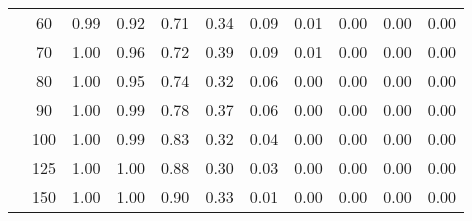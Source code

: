 \begin{table}[t]
\begin{center}
\begin{subtable}[c]{\textwidth}
\begin{center}
\begin{tabular}{rcccccccccc}
                                        & \multicolumn{1}{c|}{60}  & \num{0.99}  & \num{0.92}  & \num{0.71}  & \num{0.34}  & \num{0.09}  & \num{0.01}  & \num{0.00}  & \num{0.00}  & \num{0.00}  \\
                                        & \multicolumn{1}{c|}{70}  & \num{1.00}  & \num{0.96}  & \num{0.72}  & \num{0.39}  & \num{0.09}  & \num{0.01}  & \num{0.00}  & \num{0.00}  & \num{0.00}  \\
                                        & \multicolumn{1}{c|}{80}  & \num{1.00}  & \num{0.95}  & \num{0.74}  & \num{0.32}  & \num{0.06}  & \num{0.00}  & \num{0.00}  & \num{0.00}  & \num{0.00}  \\
                                        & \multicolumn{1}{c|}{90}  & \num{1.00}  & \num{0.99}  & \num{0.78}  & \num{0.37}  & \num{0.06}  & \num{0.00}  & \num{0.00}  & \num{0.00}  & \num{0.00}  \\
                                        & \multicolumn{1}{c|}{100}  & \num{1.00}  & \num{0.99}  & \num{0.83}  & \num{0.32}  & \num{0.04}  & \num{0.00}  & \num{0.00}  & \num{0.00}  & \num{0.00}  \\
                                        & \multicolumn{1}{c|}{125}  & \num{1.00}  & \num{1.00}  & \num{0.88}  & \num{0.30}  & \num{0.03}  & \num{0.00}  & \num{0.00}  & \num{0.00}  & \num{0.00}  \\
                                        & \multicolumn{1}{c|}{150}  & \num{1.00}  & \num{1.00}  & \num{0.90}  & \num{0.33}  & \num{0.01}  & \num{0.00}  & \num{0.00}  & \num{0.00}  & \num{0.00}  \\
                                    \end{tabular}
            \end{center}
        \end{subtable}

        \vspace{5mm}


\end{center}
\end{table}
